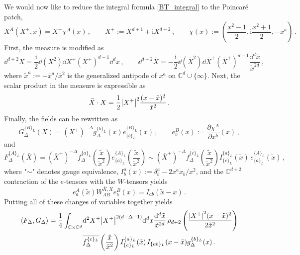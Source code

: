 \documentclass{article}
\def \Dg {\Delta}
\def \dg {\delta}
\def \ds {\partial}
\def \Cs {\mathbb{C}}
\begin{document}
We would now like to reduce the integral formula \eqref{BT_integral} to the Poincaré patch, 
\begin{equation}
X^A(X^+,x) = X^+ \chi^A(x)\,, \qquad X^+ := X^{d+1}+\mathrm{i} X^{d+2}\,, \qquad \chi(x) := \left(\frac{x^2-1}{2}, \mathrm{i}\frac{x^2+1}{2}, -x^a \right)\,. 
\end{equation}
First, the measure is modified as
\begin{equation}
\dd^{d+2} X = \frac{\mathrm{i}}{2} \dd(X^2) \dd X^+(X^+)^{d-1} \dd^d x\,, \qquad \dd^{d+2} \bar{X} = -\frac{\mathrm{i}}{2} \dd(\bar{X}^2) \dd \bar{X}^+(\bar{X}^+)^{d-1} \frac{\dd^d \tilde{x}}{\tilde{x}^{2d}}\,,
\end{equation}
where $\tilde{x}^a := -\bar{x}^a/\bar{x}^2$ is the generalized antipode of $x^a$ on $\Cs^d \cup \{\infty\}$. Next, the scalar product in the measure is expressible as
\begin{equation}
     \bar{X} \cdot X = \frac{1}{2} \abs{X^+}^2   \frac{(x-\tilde{x})^2}{\tilde{x}^2}\,. 
\end{equation}
Finally, the fields can be rewritten as
\begin{equation}
G_{\Dg}^{\{B\}_L}(X) = (X^+)^{-\Dg} g_{\Dg}^{\{b\}_L} (x) e_{\{b\}_L}^{\{B\}_L}(x) \,, \qquad e_{b}^B(x) := \frac{\ds \chi^A}{\ds x^{b}} (x)\,, 
\end{equation}
and 
\begin{equation}
\overline{F_{\Dg}^{\{A\}_L}}(\bar{X}) = (\bar{X}^+)^{-\Dg} \overline{f_{\Dg}^{\{a\}_L}} \left( \frac{\tilde{x}}{\tilde{x}^2}\right) e_{\{a\}_L}^{\{A\}_L}\left( \frac{\tilde{x}}{\tilde{x}^2}\right) \sim  (\bar{X}^+)^{-\Dg}\overline{f_{\Dg}^{\{c\}_L}} \left( \frac{\tilde{x}}{\tilde{x}^2}\right) I_{\{c\}_L}^{\{a\}_L}(\tilde{x})\, e_{\{a\}_L}^{\{A\}_L}(\tilde{x})\,,
\end{equation}
where "$\sim$" denotes gauge equivalence, $I^a_b(x) := \dg^a_b - 2 x^a x_b/x^2$, and the $\Cs^{d+2}$ contraction of the $e$-tensors with the $W$-tensors  yields
\begin{equation}
e_a^A(\tilde{x}) W_{AB}^{\bar{X},X} e_b^B(x) = I_{ab}(\tilde{x}-x)\,.     
\end{equation}
Putting all of these changes of variables together yields
\begin{align*}
\langle F_{\Dg}, G_{\Dg} \rangle = \frac{1}{4} \int_{\Cs \times \Cs^d} & \dd^2 X^+ \abs{X^+}^{2(d-\Dg-1)} \dd^d x \frac{\dd^d \tilde{x}}{\tilde{x}^{2d}} \, \rho_{d+2}\left( \frac{\abs{X^+}^2 (x-\tilde{x})^2}{2 \tilde{x}^2} \right) \\
& \overline{f_{\Dg}^{\{c\}_L}} \left( \frac{\tilde{x}}{\tilde{x}^2}\right) I_{\{c\}_L}^{\{a\}_L}(\tilde{x})\, I_{\{ab\}_L}(x-\tilde{x}) g_{\Dg}^{\{b\}_L} (x)\,.
\end{align*}
\end{document}
